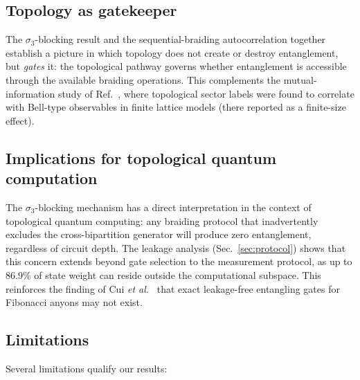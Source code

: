 \documentclass[aps,pra,twocolumn,superscriptaddress,longbibliography,floatfix,nofootinbib]{revtex4-2}
\begin{document}
\subsection{Topology as gatekeeper}

The $\sigma_3$-blocking result and the sequential-braiding
autocorrelation together establish a picture in which topology
does not create or destroy entanglement, but \emph{gates} it:
the topological pathway governs whether entanglement is
accessible through the available braiding operations.
This complements the mutual-information study of
Ref.~\cite{Sayim2026topological}, where topological sector labels
were found to correlate with Bell-type observables in finite lattice
models (there reported as a finite-size effect).

\subsection{Implications for topological quantum computation}

The $\sigma_3$-blocking mechanism has a direct interpretation in
the context of topological quantum computing:
any braiding protocol that inadvertently excludes the
cross-bipartition generator will produce zero entanglement,
regardless of circuit depth.
The leakage analysis (Sec.~\ref{sec:protocol}) shows that this
concern extends beyond gate selection to the measurement
protocol, as up to $86.9\%$ of state weight can reside outside
the computational subspace.
This reinforces the finding of Cui \emph{et al.}~\cite{Cui2019}
that exact leakage-free entangling gates for Fibonacci anyons
may not exist.

\subsection{Limitations}

Several limitations qualify our results:
\end{document}
